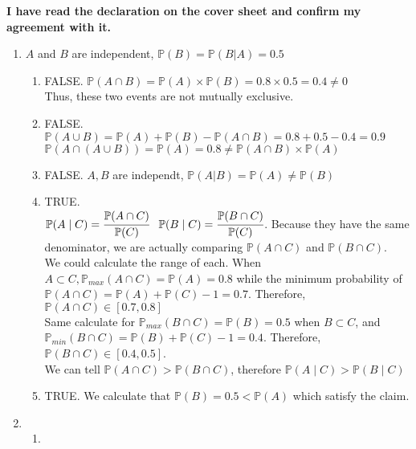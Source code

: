 \documentclass[12pt, oneside, a4paper]{article}
\begin{document}
	\textbf{I have read the declaration on the cover sheet and confirm my agreement with it.}
	\begin{enumerate}
		\item %
		$A$ and $B$ are independent, $\mathbb{P}(B) = \mathbb{P}(B|A) = 0.5$
		\begin{enumerate}[label = (\alph*)]
			\item %
			FALSE. $\mathbb{P}(A\cap B) = \mathbb{P}(A)\times \mathbb{P}(B) = 0.8 \times 0.5 = 0.4 \neq 0$\\
			Thus, these two events are not mutually exclusive. 
			\item %
			FALSE. $\mathbb{P}(A \cup B) = \mathbb{P}(A) +\mathbb{P}(B) - \mathbb{P}(A\cap B) = 0.8 + 0.5 - 0.4 = 0.9$\\
			$\mathbb{P}(A\cap(A\cup B)) = \mathbb{P}(A) = 0.8 \neq \mathbb{P}(A\cap B) \times \mathbb{P}(A)$
			\item %
			FALSE. $A,B$ are independt, $\mathbb{P}(A|B) = \mathbb{P}(A) \neq \mathbb{P}(B)$
			\item %
			TRUE. \\
			$\mathbb{P}(A\mid C) = \cfrac{\mathbb{P}(A \cap C)}{\mathbb{P}(C)} \; \; \; \mathbb{P}(B\mid C) = \cfrac{\mathbb{P}(B \cap C)}{\mathbb{P}(C)}$. Because they have the same denominator, we are actually comparing $\mathbb{P}(A \cap C)$  and $\mathbb{P}(B \cap C)$. \\
			We could calculate the range of each. When $ A \subset C, \mathbb{P}_{max}(A \cap C) = \mathbb{P}(A) = 0.8$ while the minimum probability of $\mathbb{P}(A \cap C) = \mathbb{P}(A) + \mathbb{P}(C) - 1 = 0.7$. Therefore, $\mathbb{P}(A\cap C) \in [0.7,0.8]$\\
			Same calculate for $\mathbb{P}_{max}(B\cap C) = \mathbb{P}(B) = 0.5$ when $B \subset C$, and $\mathbb{P}_{min}(B\cap C) =\mathbb{P}(B) + \mathbb{P}(C) - 1 = 0.4 $. Therefore, $\mathbb{P}(B\cap C) \in [0.4,0.5]$. \\
			We can tell $\mathbb{P}(A\cap C) > \mathbb{P}(B\cap C)$, therefore $\mathbb{P}(A\mid C)  > \mathbb{P}(B\mid C) $
			\item %
			TRUE. 
			We calculate that $\mathbb{P}(B) = 0.5 < \mathbb{P}(A)$ which satisfy the claim. 
		\end{enumerate}
		\item %
		\begin{enumerate}[label = (\alph*)]
			\item %
			\begin{enumerate}[label = (\roman*)]

\end{enumerate}
\end{enumerate}
\end{enumerate}
\end{document}
